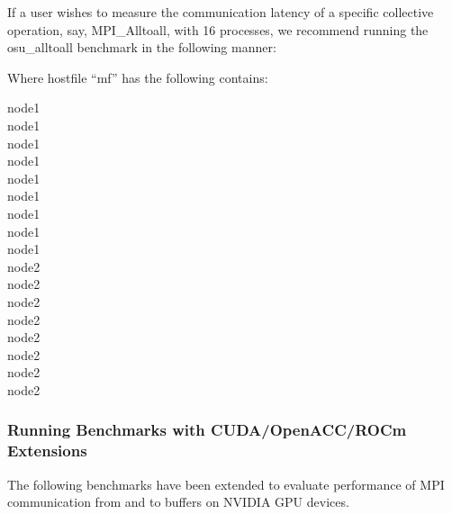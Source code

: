 If a user wishes to measure the communication latency of a specific collective operation,
say, MPI\_Alltoall, with 16 processes, we recommend running the osu\_alltoall
benchmark in the following manner: 


\noindent Where hostfile ``mf'' has the following contains:

\noindent node1\\
node1\\
node1\\
node1\\
node1\\
node1\\
node1\\
node1\\
node1\\
node2\\
node2\\
node2\\
node2\\
node2\\
node2\\
node2\\
node2\\

\subsubsection{Running Benchmarks with CUDA/OpenACC/ROCm Extensions}
\noindent The following benchmarks have been extended to evaluate performance
of MPI communication from and to buffers on NVIDIA GPU devices.

